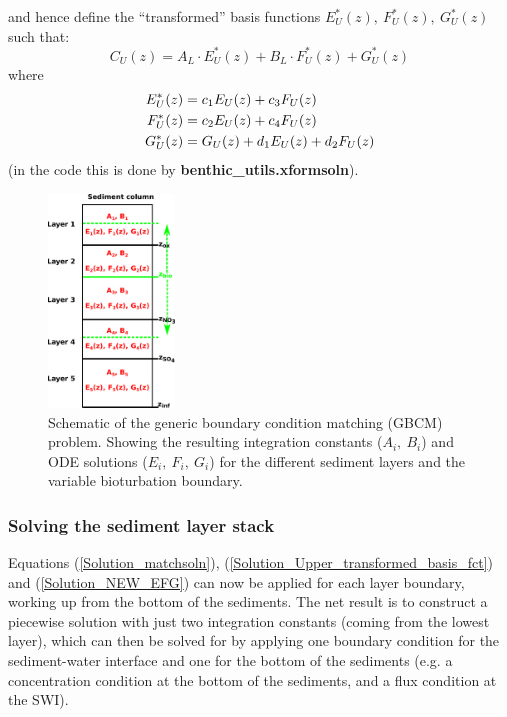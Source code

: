 \documentclass[gmd, manuscript]{copernicus}
\begin{document}
and hence define the ``transformed'' basis functions $E_U^*(z),\ F_U^*(z),\ G_U^*(z)$ such that:
\begin{equation}
 C_U(z) = A_L \cdot E_U^*(z) + B_L \cdot F_U^*(z) + G_U^*(z) \label{Solution_Upper_transformed_basis_fct}
\end{equation}
where
\begin{align}
 E_U^*(z) &= c_1 E_U(z) + c_3 F_U(z) \notag\\
 F_U^*(z) &= c_2 E_U(z) + c_4 F_U(z) \label{Solution_NEW_EFG}\\
 G_U^*(z) &= G_U(z) + d_1 E_U(z) + d_2 F_U(z) \notag
\end{align}
(in the code this is done by \textsf{\textbf{benthic\_utils.xformsoln}}).

\begin{figure}[htbp]
\begin{center}
	\includegraphics[width=0.3\textwidth]{figures/Boundary_Matching_zbio.pdf}
	\caption{Schematic of the generic boundary condition matching (GBCM) problem. Showing the resulting integration constants ($A_i,\ B_i$) and ODE solutions ($E_i,\ F_i,\ G_i$) for the different sediment layers and the variable 
	bioturbation boundary.}
	\label{fig:Boundary_matching_algo}
	\end{center}
\end{figure}

\subsubsection*{Solving the sediment layer stack}
Equations (\ref{Solution_matchsoln}), (\ref{Solution_Upper_transformed_basis_fct}) and (\ref{Solution_NEW_EFG}) can now be applied for each layer boundary, working up from the bottom of the sediments. 
The net result is to construct a piecewise solution with just two integration constants (coming from the lowest layer), which can then be solved for by applying one boundary condition for the sediment-water interface 
and one for the bottom of the sediments (e.g. a concentration condition at the bottom of the sediments, and a flux condition at the SWI).
\end{document}
